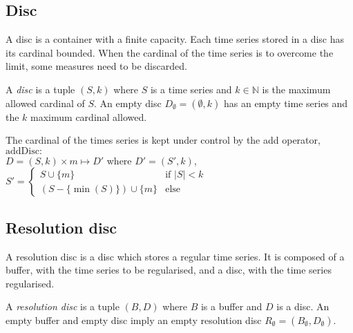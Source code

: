 \subsection{Disc}\label{sec:model:disc}

A disc is a container with a finite capacity. Each time series stored
in a disc has its cardinal bounded. When the cardinal of the time
series is to overcome the limit, some measures need to be discarded.

\begin{definition}[Disc]
  A \emph{disc} is a tuple $(S,k)$ where $S$ is a time series and
  $k\in\mathbb{N}$ is the maximum allowed cardinal of $S$.  An empty
  disc $D_{\emptyset} = (\emptyset,k)$ has an empty time series and
  the $k$ maximum cardinal allowed.
\end{definition}


The cardinal of the times series is kept under control by the add
operator,
 $\text{addDisc}:$ \\
$D=(S,k) \times m \mapsto D'$ where $ D' =
(S',k)$, \linebreak[4]
$S' =
  \begin{cases}
      S\cup\{m\} &\text{if }  |S|<k\\
      (S-\{\min(S)\}) \cup \{m\} & \text{else }
    \end{cases}  
    $



\subsection{Resolution disc}

A resolution disc is a disc which stores a regular time series. It is
composed of a buffer, with the time series to be regularised, and a
disc, with the time series regularised.

\begin{definition}
  A \emph{resolution disc} is a tuple $(B,D)$ where $B$ is a buffer
  and $D$ is a disc.  An empty buffer and empty disc imply an empty
  resolution disc $R_{\emptyset} = (B_{\emptyset},D_{\emptyset})$.
\end{definition}
 
